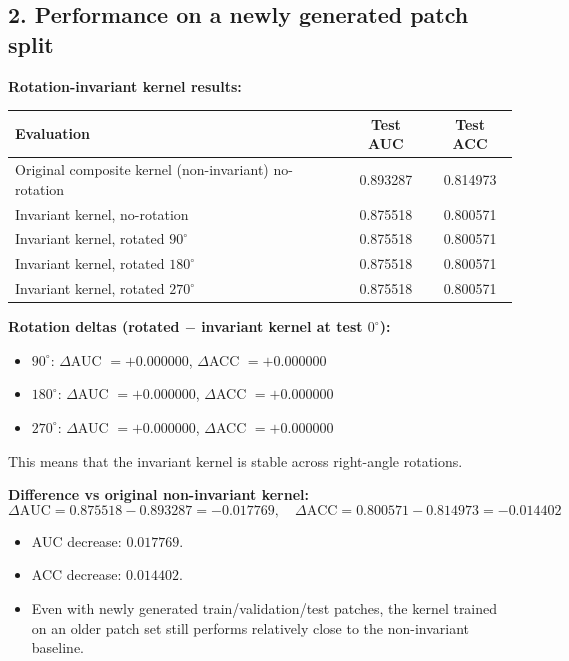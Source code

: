 \documentclass{article}
\begin{document}
\subsection*{\hypertarget{ans2}{2. Performance on a newly generated patch split}}

\textbf{Rotation-invariant kernel results:}
\begin{center}
\begin{tabular}{lcc}
\toprule
Evaluation & Test AUC & Test ACC \\
\midrule
Original composite kernel (non-invariant) no-rotation & 0.893287 & 0.814973 \\
Invariant kernel, no-rotation & 0.875518 & 0.800571 \\
Invariant kernel, rotated $90^\circ$ & 0.875518 & 0.800571 \\
Invariant kernel, rotated $180^\circ$ & 0.875518 & 0.800571 \\
Invariant kernel, rotated $270^\circ$ & 0.875518 & 0.800571 \\
\bottomrule
\end{tabular}
\end{center}

\vspace{0.5em}
\textbf{Rotation deltas (rotated $-$ invariant kernel at test $0^\circ$):}
\begin{itemize}
    \item $90^\circ$: $\Delta$AUC $= +0.000000$, $\Delta$ACC $= +0.000000$
    \item $180^\circ$: $\Delta$AUC $= +0.000000$, $\Delta$ACC $= +0.000000$
    \item $270^\circ$: $\Delta$AUC $= +0.000000$, $\Delta$ACC $= +0.000000$
\end{itemize}
This means that the invariant kernel is stable across right-angle rotations.

\vspace{0.5em}
\textbf{Difference vs original non-invariant kernel:}
\[
\Delta \text{AUC} = 0.875518 - 0.893287 = -0.017769,\quad
\Delta \text{ACC} = 0.800571 - 0.814973 = -0.014402
\]
\begin{itemize}
    \item AUC decrease: $0.017769$.
    \item ACC decrease: $0.014402$.
    \item Even with newly generated train/validation/test patches, the kernel trained on an older patch set still performs relatively close to the non-invariant baseline.
\end{itemize}
\end{document}

